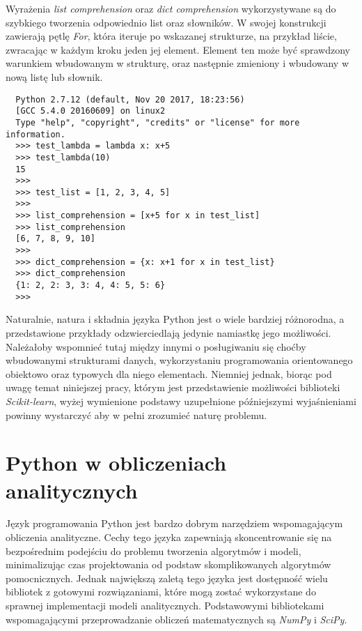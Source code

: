 Wyrażenia \textit{list comprehension} oraz \textit{dict comprehension} wykorzystywane są do szybkiego tworzenia odpowiednio list oraz słowników.
W swojej konstrukcji zawierają pętlę \textit{For}, która iteruje po wskazanej strukturze, na przykład liście, zwracając w każdym kroku jeden jej element.
Element ten może być sprawdzony warunkiem wbudowanym w strukturę, oraz następnie zmieniony i wbudowany w nową listę lub słownik.

\begin{lstlisting}
  Python 2.7.12 (default, Nov 20 2017, 18:23:56) 
  [GCC 5.4.0 20160609] on linux2
  Type "help", "copyright", "credits" or "license" for more information. 
  >>> test_lambda = lambda x: x+5
  >>> test_lambda(10)
  15
  >>> 
  >>> test_list = [1, 2, 3, 4, 5]
  >>> 
  >>> list_comprehension = [x+5 for x in test_list]
  >>> list_comprehension
  [6, 7, 8, 9, 10]
  >>> 
  >>> dict_comprehension = {x: x+1 for x in test_list}
  >>> dict_comprehension
  {1: 2, 2: 3, 3: 4, 4: 5, 5: 6}
  >>> 
\end{lstlisting}

Naturalnie, natura i składnia języka Python jest o wiele bardziej różnorodna, a przedstawione przykłady odzwierciedlają jedynie namiastkę jego możliwości.
Należałoby wspomnieć tutaj między innymi o posługiwaniu się choćby wbudowanymi strukturami danych, wykorzystaniu programowania orientowanego obiektowo oraz typowych dla niego elementach.
Niemniej jednak, biorąc pod uwagę temat niniejszej pracy, którym jest przedstawienie możliwości biblioteki \textit{Scikit-learn}, wyżej wymienione podstawy uzupełnione późniejszymi wyjaśnieniami powinny wystarczyć aby w pełni zrozumieć naturę problemu.




\section{Python w obliczeniach analitycznych}
Język programowania Python jest bardzo dobrym narzędziem wspomagającym obliczenia analityczne.
Cechy tego języka zapewniają skoncentrowanie się na bezpośrednim podejściu do problemu tworzenia algorytmów i modeli, minimalizując czas projektowania od podstaw skomplikowanych algorytmów pomocnicznych.
Jednak największą zaletą tego języka jest dostępność wielu bibliotek z gotowymi rozwiązaniami, które mogą zostać wykorzystane do sprawnej implementacji modeli analitycznych.
Podstawowymi bibliotekami wspomagającymi przeprowadzanie obliczeń matematycznych są \textit{NumPy} i \textit{SciPy}.\\

